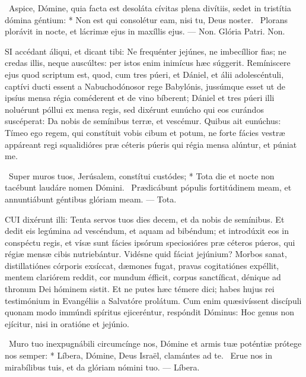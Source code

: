 \R\ Aspice, Dómine, quia facta est desoláta cívitas plena divítiis, sedet in tristítia dómina géntium: * Non est qui consolétur eam, nisi tu, Deus noster. \V\ Plorans plorávit in nocte, et lácrimæ ejus in maxíllis ejus. — Non. Glória Patri. Non.





\lettrine[lines=2]{S}{I} accédant áliqui, et dicant tibi: Ne frequénter jejúnes, ne imbecíllior fias; ne credas illis, neque auscúltes: per istos enim inimícus hæc súggerit. Remíniscere ejus quod scriptum est, quod, cum tres púeri, et Dániel, et álii adolescéntuli, captívi ducti essent a Nabuchodónosor rege Babylónis, jussúmque esset ut de ipsíus mensa régia coméderent et de vino bíberent; Dániel et tres púeri illi noluérunt póllui ex mensa regis, sed dixérunt eunúcho qui eos curándos suscéperat: Da nobis de semínibus terræ, et vescémur. Quibus ait eunúchus: Tímeo ego regem, qui constítuit vobis cibum et potum, ne forte fácies vestræ appáreant regi squalidióres præ céteris púeris qui régia mensa alúntur, et púniat me.

\R\ Super muros tuos, Jerúsalem, constítui custódes; * Tota die et nocte non tacébunt laudáre nomen Dómini. \V\ Prædicábunt pópulis fortitúdinem meam, et annuntiábunt géntibus glóriam meam. — Tota.


\lettrine[lines=2]{C}{UI} dixérunt illi: Tenta servos tuos dies decem, et da nobis de semínibus. Et dedit eis legúmina ad vescéndum, et aquam ad bibéndum; et introdúxit eos in conspéctu regis, et vísæ sunt fácies ipsórum speciosióres præ céteros púeros, qui régiæ mensæ cibis nutriebántur. Vidésne quid fáciat jejúnium? Morbos sanat, distillatiónes córporis exsíccat, dæmones fugat, pravas cogitatiónes expéllit, mentem clariórem reddit, cor mundum éfficit, corpus sanctíficat, dénique ad thronum Dei hóminem sistit. Et ne putes hæc témere dici; habes hujus rei testimónium in Evangéliis a Salvatóre prolátum. Cum enim quæsivíssent discípuli quonam modo immúndi spíritus ejiceréntur, respóndit Dóminus: Hoc genus non ejícitur, nisi in oratióne et jejúnio.

\R\ Muro tuo inexpugnábili circumcínge nos, Dómine et armis tuæ poténtiæ prótege nos semper: * Líbera, Dómine, Deus Israël, clamántes ad te. \V\ Erue nos in mirabílibus tuis, et da glóriam nómini tuo. — Líbera.

